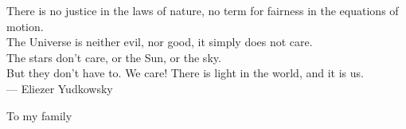 \cleardoublepage
\thispagestyle{empty}


\vspace*{3cm}

\begin{raggedleft}
    	There is no justice in the laws of nature, no term for fairness in the equations of motion. \\
    	The Universe is neither evil, nor good, it simply does not care. \\
    	The stars don't care, or the Sun, or the sky. \\    	   	
    	\vspace{0.5em}
    	But they don't have to. We care! There is light in the world, and it is us.\\
    	\vspace{2em} 	    	
     --- Eliezer Yudkowsky \\
\end{raggedleft}

\vspace{4cm}

\begin{center}
    To my family
\end{center}



